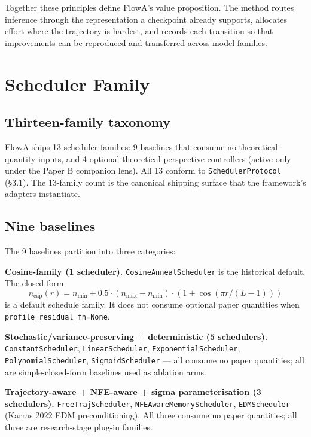 \documentclass[journal,twocolumn,final]{IEEEtran}
\begin{document}
Together these principles define FlowA's value proposition. The method routes inference through the representation a checkpoint already supports, allocates effort where the trajectory is hardest, and records each transition so that improvements can be reproduced and transferred across model families.



\section{Scheduler Family}

\subsection{Thirteen-family taxonomy}

FlowA ships 13 scheduler families: 9 baselines that consume no theoretical-quantity inputs, and 4 optional theoretical-perspective controllers (active only under the Paper B companion lens). All 13 conform to \texttt{SchedulerProtocol} (\S3.1). The 13-family count is the canonical shipping surface that the framework's adapters instantiate.

\subsection{Nine baselines}

The 9 baselines partition into three categories:

\textbf{Cosine-family (1 scheduler).} \texttt{CosineAnnealScheduler} is the historical default. The closed form
\[
n_\text{cap}(r) = n_\text{min} + 0.5 \cdot (n_\text{max} - n_\text{min}) \cdot (1 + \cos(\pi r / (L - 1)))
\]
is a default schedule family. It does not consume optional paper quantities when \texttt{profile\_residual\_fn=None}.

\textbf{Stochastic/variance-preserving + deterministic (5 schedulers).} \texttt{ConstantScheduler}, \texttt{LinearScheduler}, \texttt{ExponentialScheduler}, \texttt{PolynomialScheduler}, \texttt{SigmoidScheduler} --- all consume no paper quantities; all are simple-closed-form baselines used as ablation arms.

\textbf{Trajectory-aware + NFE-aware + sigma parameterisation (3 schedulers).} \texttt{FreeTrajScheduler}, \texttt{NFEAwareMemoryScheduler}, \texttt{EDMScheduler} (Karras 2022 EDM preconditioning). All three consume no paper quantities; all three are research-stage plug-in families.
\end{document}
